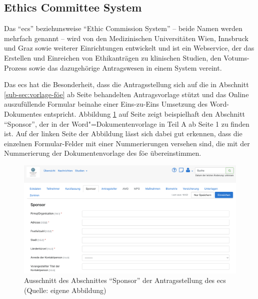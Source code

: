 \documentclass[a4paper,12pt,twoside]{scrreprt}
\begin{document}
\subsection{Ethics Committee System}
\label{sub-sec:ecs}

Das \enquote{\ac{ecs}} beziehunsweise \enquote{Ethic Commission System} -- beide Namen werden mehrfach genannt -- wird von den Medizinischen Universitäten Wien, Innsbruck und Graz sowie weiterer Einrichtungen entwickelt und ist ein Webservice, der das Erstellen und Einreichen von Ethikanträgen zu klinischen Studien, den Votums-Prozess sowie das dazugehörige Antragswesen in einem System vereint. \cite{medizinische_universitat_wien_ecs_2021-1}

\medskip

Das \ac{ecs} hat die Besonderheit, dass die Antragsstellung sich auf die in Abschnitt \ref{sub-sec:vorlage-föe} ab Seite \pageref{sub-sec:vorlage-föe} behandelten Antragsvorlage stützt und das Online auszufüllende Formular beinahe einer Eins-zu-Eins Umsetzung des Word-Dokumentes entspricht. Abbildung \ref{fig:abschnitt-sponsor-ecs} auf Seite \pageref{fig:abschnitt-sponsor-ecs} zeigt beispielhaft den Abschnitt \enquote{Sponsor}, der in der Word"=Dokumentenvorlage in Teil A ab Seite 1 zu finden ist. Auf der linken Seite der Abbildung lässt sich dabei gut erkennen, dass die einzelnen Formular-Felder mit einer Nummerierungen versehen sind, die mit der Nummerierung der Dokumentenvorlage des \ac{föe} übereinstimmen.

\begin{figure}[ht]
    \centering
    \includegraphics[width=\linewidth]{thesis/images/Luidold_ECS-Schritt-Eckdaten.png}
    \caption[Ausschnitt des Abschnittes \enquote{Sponsor} der Antragsstellung des \acl{ecs}]{Ausschnitt des Abschnittes \enquote{Sponsor} der Antragsstellung des \acl{ecs} (Quelle: eigene Abbildung)}
    \label{fig:abschnitt-sponsor-ecs}
\end{figure}
\end{document}

